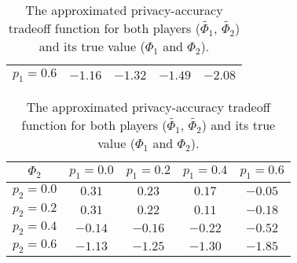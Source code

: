 \documentclass[USenglish,oneside,twocolumn]{article}
\theoremstyle{plain}
\begin{document}
\begin{appendices}
\begin{table}[h]
\begin{tabular}{|c||c|c|c|c|}
                \hline
                $p_1=0.6$ & $\num{-1.16}$ & $\num{-1.32}$ & $\num{-1.49}$ & $\num{-2.08}$\\
                \hline
            \end{tabular}
            \begin{tabular}{|c||c|c|c|c|}
                \hline
                $\Phi_2$ & $p_1=0.0$ & $p_1=0.2$ & $p_1=0.4$ & $p_1=0.6$\\
                \hline
                \hline
                $p_2=0.0$ & $\num{0.31}$ & $\num{0.23}$ & $\num{0.17}$ & $\num{-0.05}$\\
                \hline
                $p_2=0.2$ & $\num{0.31}$ & $\num{0.22}$ & $\num{0.11}$ & $\num{-0.18}$\\
                \hline
                $p_2=0.4$ & $\num{-0.14}$ & $\num{-0.16}$ & $\num{-0.22}$ & $\num{-0.52}$\\
                \hline
                $p_2=0.6$ & $\num{-1.13}$ & $\num{-1.25}$ & $\num{-1.30}$ & $\num{-1.85}$\\
                \hline
            \end{tabular}
            \vspace{0.1cm}
            \caption{The approximated privacy-accuracy tradeoff function for both players ($\widetilde{\Phi_1}$, $\widetilde{\Phi_2}$) and its true value ($\Phi_1$ and $\Phi_2$).}
        \end{table}
    \end{appendices}
\end{document}
